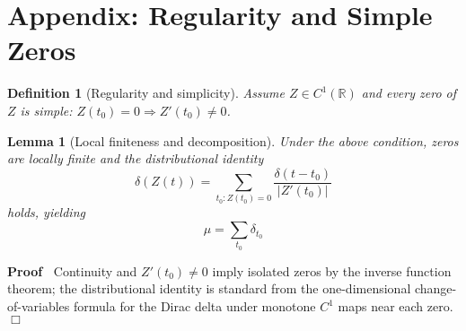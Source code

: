 \documentclass{article}
\newenvironment{proof}{\noindent\textbf{Proof\ }}{\hspace*{\fill}$\Box$\medskip}
\newtheorem{definition}{Definition}
\newtheorem{lemma}{Lemma}
\begin{document}
\section{Appendix: Regularity and Simple Zeros}

\begin{definition}
  [Regularity and simplicity] Assume $Z \in C^1 (\mathbb{R})$ and every zero
  of $Z$ is simple: $Z (t_0) = 0 \Longrightarrow Z' (t_0) \neq 0$.
\end{definition}

\begin{lemma}
  [Local finiteness and decomposition] Under the above condition, zeros are
  locally finite and the distributional identity
  \begin{equation}
    \delta (Z (t)) = \sum_{t_0 : Z (t_0) = 0} \frac{\delta (t - t_0)}{|Z'
    (t_0) |}
  \end{equation}
  holds, yielding
  \begin{equation}
    \mu = \sum_{t_0} \delta_{t_0}
  \end{equation}
\end{lemma}

\begin{proof}
  Continuity and $Z' (t_0) \neq 0$ imply isolated zeros by the inverse
  function theorem; the distributional identity is standard from the
  one-dimensional change-of-variables formula for the Dirac delta under
  monotone $C^1$ maps near each zero.
\end{proof}
\end{document}

